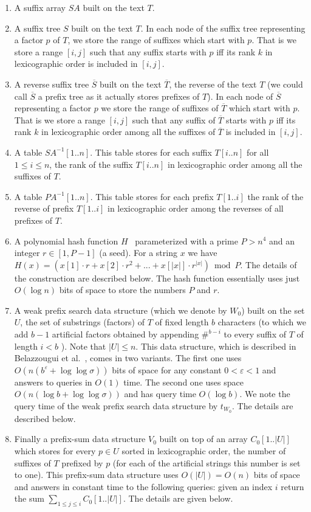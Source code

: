 \documentclass{article}
\newcommand{\?}{\mskip1.5mu}
\renewcommand{\epsilon}{\varepsilon}
\begin{document}
\begin{enumerate}
\item A suffix array $SA$ built on the text $T$. 
\item A suffix tree $S$ built on the text $T$. In each node of the suffix tree representing a factor $p$ of $T$, we store the range of suffixes which start with $p$. That is we store a range $[i,j]$ such that any suffix starts with $p$ iff its rank $k$ in lexicographic order is included in $[i,j]$. 
\item A reverse suffix tree $\overline{S}$ built on the text $\overline{T}$, the reverse of the text $T$ (we could call $\overline{S}$ a prefix tree as it actually stores prefixes of $T$). In each node of $\overline{S}$ representing a factor $p$ we store the range of suffixes of $\overline{T}$ which start with $p$. That is we store a range $[i,j]$ such that any suffix of $\overline{T}$ starts with $p$ iff its rank $k$ in lexicographic order among all the suffixes of $\overline{T}$ is included in $[i,j]$. 
\item A table $SA^{-1}[1..n]$. This table stores for each suffix $T[i..n]$ for all $1\leq i\leq n$, the rank of the suffix $T[i..n]$ in lexicographic order among all the suffixes of $T$. 
\item A table $PA^{-1}[1..n]$. This table stores for each prefix $T[1..i]$ the rank of the reverse of prefix $T[1..i]$ in lexicographic order among the reverses of all prefixes of $T$.  
\item A polynomial hash function $H$~\cite{KR87} parameterized with a prime $P>n^4$ and an integer $r\in[1,P-1]$ (a seed). For a string $x$ we have $H(x)=(x[1]\cdot r+x[2]\cdot r^2+...+x[|x|]\cdot r^{|x|})\bmod P$. The details of the construction are described below. The hash function essentially uses just $O(\log n)$ bits of space to store the numbers $P$ and $r$. 
\item A weak prefix search data structure (which we denote by $W_0$) built on the set $U$, the set of substrings (factors) of $T$ of fixed length $b$ characters (to which we add $b-1$ artificial factors obtained by appending $\#^{b-i}$ to every suffix of $T$ of length $i<b$ ). Note that $|U|\leq n$. This data structure, which is described in Belazzougui et al.~\cite{BBPV10}, comes in two variants. The first one uses $O(n(b^\epsilon+\log\log\sigma))$ bits of space for any constant $0<\epsilon<1$ and answers to queries in $O(1)$ time.  The second one uses space $O(n(\log b+\log\log\sigma))$ and has query time $O(\log b)$. We note the query time of the weak prefix search data structure by $t_{W_0}$. The details are described below. 
\item Finally a prefix-sum data structure $V_0$ built on top of an array $C_0[1..|U|]$ which stores for every $p\in U$ sorted in lexicographic order, the number of suffixes of $T$ prefixed by $p$ (for each of the artificial strings this number is set to one). This prefix-sum data structure uses $O(|U|)=O(n)$ bits of space and answers in constant time to the following queries: given an index $i$ return the sum $\sum_{1\leq j\leq i} C_0[1..|U|]$. The details are given below. 
\end{enumerate}
\end{document}
